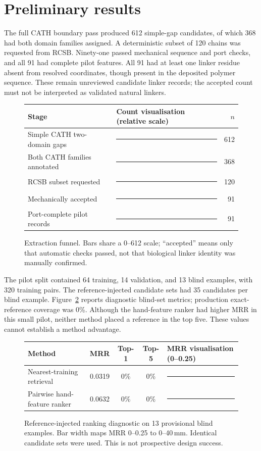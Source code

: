 \documentclass[10pt,a4paper]{article}
\begin{document}
\section{Preliminary results}
The full CATH boundary pass produced 612 simple-gap candidates, of which 368 had both domain families assigned. A deterministic subset of 120 chains was requested from RCSB. Ninety-one passed mechanical sequence and port checks, and all 91 had complete pilot features. All 91 had at least one linker residue absent from resolved coordinates, though present in the deposited polymer sequence. These remain unreviewed candidate linker records; the accepted count must not be interpreted as validated natural linkers.

\begin{figure}[h]
\centering
\begin{tabular}{@{}l l r@{}}
\toprule
Stage & Count visualisation (relative scale) & $n$\\
\midrule
Simple CATH two-domain gaps & \rule{60mm}{2.2mm} & 612\\
Both CATH families annotated & \rule{36.1mm}{2.2mm} & 368\\
RCSB subset requested & \rule{11.8mm}{2.2mm} & 120\\
Mechanically accepted & \rule{8.9mm}{2.2mm} & 91\\
Port-complete pilot records & \rule{8.9mm}{2.2mm} & 91\\
\bottomrule
\end{tabular}
\caption{Extraction funnel. Bars share a 0--612 scale; ``accepted'' means only that automatic checks passed, not that biological linker identity was manually confirmed.}
\label{fig:funnel}
\end{figure}

The pilot split contained 64 training, 14 validation, and 13 blind examples, with 320 training pairs. The reference-injected candidate sets had 35 candidates per blind example. Figure~\ref{fig:ranking} reports diagnostic blind-set metrics; production exact-reference coverage was 0\%. Although the hand-feature ranker had higher MRR in this small pilot, neither method placed a reference in the top five. These values cannot establish a method advantage.

\begin{figure}[h]
\centering
\begin{tabular}{@{}l c c c l@{}}
\toprule
Method & MRR & Top-1 & Top-5 & MRR visualisation (0--0.25)\\
\midrule
Nearest-training retrieval & 0.0319 & 0\% & 0\% & \rule{5.1mm}{2.2mm}\\
Pairwise hand-feature ranker & 0.0632 & 0\% & 0\% & \rule{10.1mm}{2.2mm}\\
\bottomrule
\end{tabular}
\caption{Reference-injected ranking diagnostic on 13 provisional blind examples. Bar width maps MRR 0--0.25 to 0--40\,mm. Identical candidate sets were used. This is not prospective design success.}
\label{fig:ranking}
\end{figure}
\end{document}
